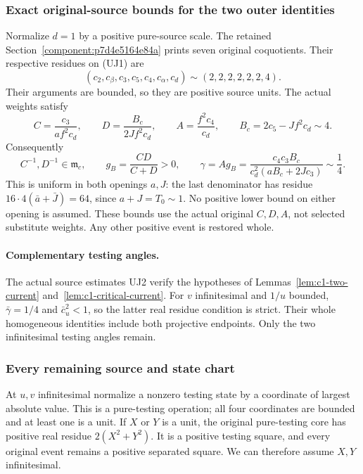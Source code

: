 \subsubsection*{Exact original-source bounds for the two outer identities}

Normalize $d=1$ by a positive pure-source scale. The retained
Section~\ref{component:p7d4e5164e84a} prints seven original coquotients.
Their respective residues on (UJ1) are
\[
 (c_2,c_\beta,c_3,c_5,c_4,c_\alpha,c_d)
                    \sim(2,2,2,2,2,2,4).
\]
Their arguments are bounded, so they are positive source units.
The actual weights satisfy
\[
 C=\frac{c_3}{af^2c_d},\qquad
 D=\frac{B_c}{2Jf^2c_d},\qquad A=\frac{f^2c_4}{c_d},
 \qquad B_c=2c_5-Jf^2c_d\sim4.
\]
Consequently
\[
 C^{-1},D^{-1}\in\mathfrak m_c,\qquad
 g_B=\frac{CD}{C+D}>0,\qquad
 \gamma=A g_B=
 \frac{c_4c_3B_c}{c_d^2(aB_c+2Jc_3)}\sim\frac14.
                                                               \tag{UJ2}
\]
This is uniform in both openings $a,J$: the last denominator has
residue $16\cdot4(\bar a+\bar J)=64$, since $a+J=T_0\sim1$.
No positive lower bound on either opening is assumed.
These bounds use the actual original $C,D,A$, not selected
substitute weights. Any other positive event is restored whole.

\paragraph{Complementary testing angles.}
The actual source estimates UJ2 verify the hypotheses of
Lemmas~\ref{lem:c1-two-current} and~\ref{lem:c1-critical-current}.
For $v$ infinitesimal and $1/u$ bounded, $\bar\gamma=1/4$
and $\bar c_u^2<1$, so the latter real residue condition is strict.
Their whole homogeneous identities include both projective endpoints.
Only the two infinitesimal testing angles remain.
\subsubsection*{Every remaining source and state chart}

At $u,v$ infinitesimal normalize a nonzero testing state by a
coordinate of largest absolute value. This is a pure-testing
operation; all four coordinates are bounded and at least one
is a unit. If $X$ or $Y$ is a unit, the original pure-testing
core has positive real residue $2(X^2+Y^2)$. It is a positive
testing square, and every original event remains a positive
separated square. We can therefore assume $X,Y$ infinitesimal.

